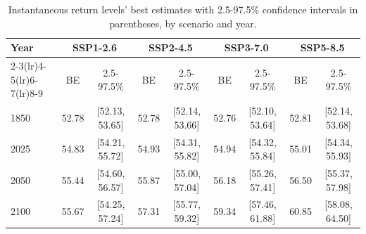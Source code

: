 \begin{table}[htbp]
\centering
\begin{tabular}{lcccccccc}
\toprule
Year & \multicolumn{2}{c}{\textbf{SSP1-2.6}} & \multicolumn{2}{c}{\textbf{SSP2-4.5}} & \multicolumn{2}{c}{\textbf{SSP3-7.0}} & \multicolumn{2}{c}{\textbf{SSP5-8.5}} \\
\cmidrule(lr){2-3}\cmidrule(lr){4-5}\cmidrule(lr){6-7}\cmidrule(lr){8-9}
 & BE & 2.5-97.5\% & BE & 2.5-97.5\% & BE & 2.5-97.5\% & BE & 2.5-97.5\% \\
\midrule
1850 & 52.78 & [52.13, 53.65] & 52.78 & [52.14, 53.66] & 52.76 & [52.10, 53.64] & 52.81 & [52.14, 53.68] \\
2025 & 54.83 & [54.21, 55.72] & 54.93 & [54.31, 55.82] & 54.94 & [54.32, 55.84] & 55.01 & [54.34, 55.93] \\
2050 & 55.44 & [54.60, 56.57] & 55.87 & [55.00, 57.04] & 56.18 & [55.26, 57.41] & 56.50 & [55.37, 57.98] \\
2100 & 55.67 & [54.25, 57.24] & 57.31 & [55.77, 59.32] & 59.34 & [57.46, 61.88] & 60.85 & [58.08, 64.50] \\
\bottomrule
\end{tabular}
\caption{Instantaneous return levels' best estimates with 2.5-97.5\% confidence intervals in parentheses, by scenario and year.}
\label{tab:scenarios}
\end{table}
